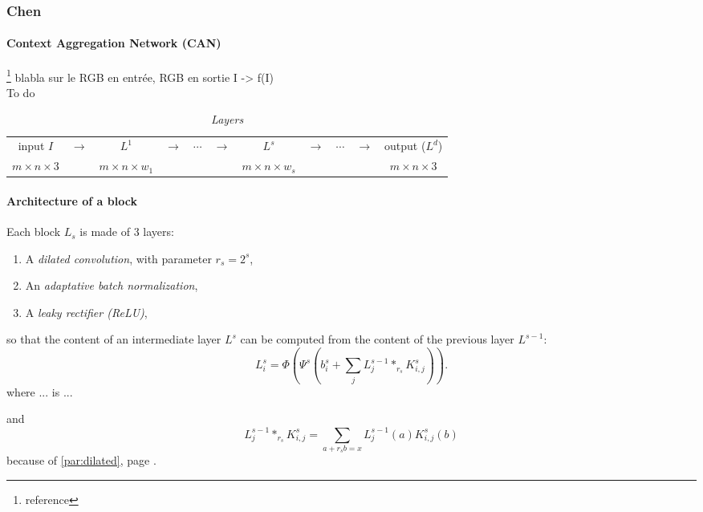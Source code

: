 \documentclass{article}
\begin{document}
        \newpage
        \subsubsection{Chen}
            \paragraph{Context Aggregation Network (CAN)}\footnote{reference}
            blabla sur le RGB en entrée, RGB en sortie I -> f(I)\\
            To do
            \begin{table}[!ht]
                \center
                \begin{tabular}{ccccccccccc}
                    \hline
                    input $I$ & $\longrightarrow$ & $L^1$ & $\longrightarrow$ & $\cdots$ & $\longrightarrow$ & $L^s$ & $\longrightarrow$ & $\cdots$ & $\longrightarrow$ & output ($L^d$)\\
                    $m\times n\times 3$ & & $m\times n\times w_1$ & & & & $m\times n\times w_s$ & & & & $m\times n\times 3$\\
                    \hline
                \end{tabular}
                \caption{\textit{Layers}}
            \end{table}

            \paragraph{Architecture of a block}
            Each block $L_s$ is made of 3 layers:
            \begin{enumerate}
                \item A \textit{dilated convolution}, with parameter $r_s=2^s$,
                \item An \textit{adaptative batch normalization},
                \item A \textit{leaky rectifier (ReLU)},
            \end{enumerate}
            so that the content of an intermediate layer $L^s$ can be computed from the content of the previous layer $L^{s-1}$:
            \begin{equation}
                L_i^s=\Phi\left(\Psi^s\left(b_i^s+\sum_jL_j^{s-1}*_{r_s}K^s_{i,j}\right)\right).
            \end{equation}
            where ... is ...

            and
            \begin{equation}
                L_j^{s-1}*_{r_s}K^s_{i,j}=\sum_{a+r_sb=x}L_j^{s-1}(a)K_{i,j}^s(b)
            \end{equation}
            because of \ref{par:dilated}, page \pageref{par:dilated}.
\end{document}
